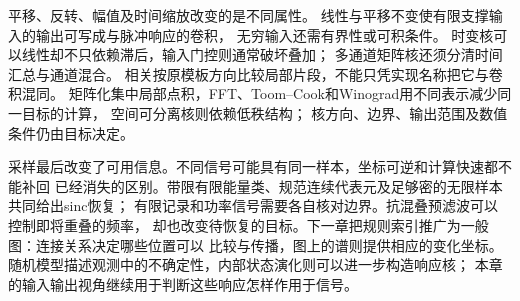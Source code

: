 平移、反转、幅值及时间缩放改变的是不同属性。
线性与平移不变使有限支撑输入的输出可写成与脉冲响应的卷积，
无穷输入还需有界性或可积条件。
时变核可以线性却不只依赖滞后，输入门控则通常破坏叠加；
多通道矩阵核还须分清时间汇总与通道混合。
相关按原模板方向比较局部片段，不能只凭实现名称把它与卷积混同。
矩阵化集中局部点积，FFT、Toom--Cook和Winograd用不同表示减少同一目标的计算，
空间可分离核则依赖低秩结构；
核方向、边界、输出范围及数值条件仍由目标决定。

采样最后改变了可用信息。不同信号可能具有同一样本，坐标可逆和计算快速都不能补回
已经消失的区别。带限有限能量类、规范连续代表元及足够密的无限样本共同给出sinc恢复；
有限记录和功率信号需要各自核对边界。抗混叠预滤波可以控制即将重叠的频率，
却也改变待恢复的目标。下一章把规则索引推广为一般图：连接关系决定哪些位置可以
比较与传播，图上的谱则提供相应的变化坐标。
随机模型描述观测中的不确定性，内部状态演化则可以进一步构造响应核；
本章的输入输出视角继续用于判断这些响应怎样作用于信号。
